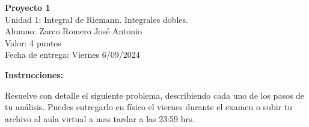 \documentclass[12pt]{exam}
\begin{document}
\centering

\Large 
\textbf{Proyecto 1}\\
\large 
Unidad 1: Integral de Riemann. Integrales dobles. \\
Alumno: Zarco Romero José Antonio\\
Valor: 4 puntos\\
\normalsize
Fecha de entrega: 
Viernes 6/09/2024

\vskip10pt

\normalsize

\pointformat{\bfseries\boldmath(\thepoints)}
\vskip10pt

\begin{tcolorbox}
  \textbf{Instrucciones:}

  Resuelve con detalle el siguiente problema, describiendo cada uno de los pasos de tu análisis. Puedes entregarlo en físico el viernes durante el examen o subir tu archivo al aula virtual a mas tardar a las 23:59 hrs.
\end{tcolorbox}
\end{document}
